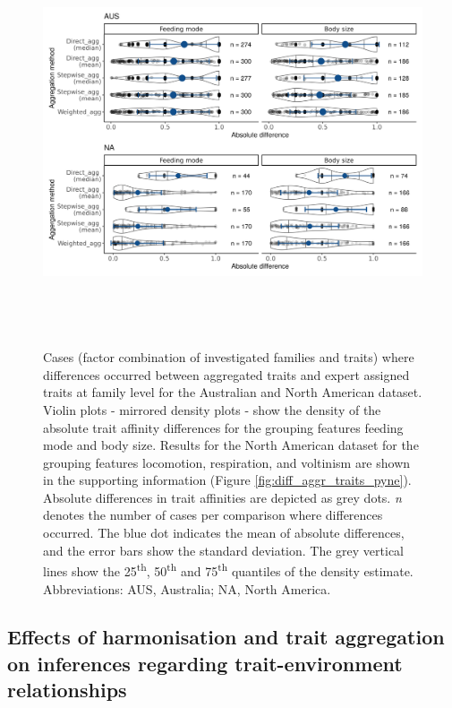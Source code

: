 \documentclass[12pt]{article}
\begin{document}
\begin{figure}[H]
  \centering
  \includegraphics[width=16.5cm, height=12cm]{Deviances_trait_agg_combined.png}
  \caption{Cases (factor combination of investigated families and traits) where differences occurred between aggregated traits and expert assigned traits at family level for the Australian and North American dataset. Violin plots - mirrored density plots - show the density of the absolute trait affinity differences for the grouping features feeding mode and body size. Results for the North American dataset for the grouping features locomotion, respiration, and voltinism are shown in the supporting information (Figure \ref{fig:diff_aggr_traits_pyne}). Absolute differences in trait affinities are depicted as grey dots. \textit{n} denotes the number of cases per comparison where differences occurred. The blue dot indicates the mean of absolute differences, and the error bars show the standard deviation. The grey vertical lines show the 25\textsuperscript{th}, 50\textsuperscript{th} and 75\textsuperscript{th} quantiles of the density estimate. Abbreviations: AUS, Australia; NA, North America.}
  \label{fig:diff_aggr_traits_combined}
\end{figure}

\newpage


\subsection*{Effects of harmonisation and trait aggregation on inferences regarding trait-environment relationships}
\end{document}
